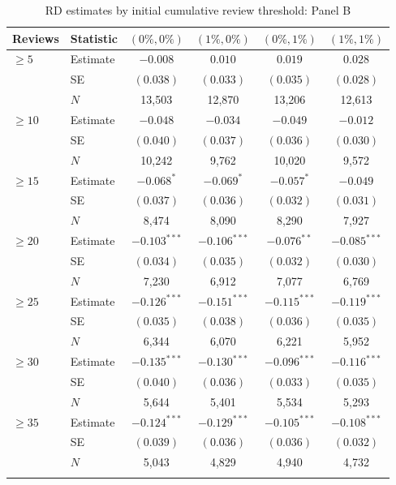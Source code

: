 \begin{table}[!htbp]
\centering
\caption{RD estimates by initial cumulative review threshold: Panel B}
\label{tab:review_threshold_5to40_panel_b}
\small
\begin{tabular}{llcccc}
\toprule
Reviews & Statistic & $(0\%,0\%)$ & $(1\%,0\%)$ & $(0\%,1\%)$ & $(1\%,1\%)$ \\
\midrule
$\geq 5$ & Estimate & $-0.008$ & $0.010$ & $0.019$ & $0.028$ \\
 & SE & $(0.038)$ & $(0.033)$ & $(0.035)$ & $(0.028)$ \\
 & $N$ & 13,503 & 12,870 & 13,206 & 12,613 \\
\addlinespace
$\geq 10$ & Estimate & $-0.048$ & $-0.034$ & $-0.049$ & $-0.012$ \\
 & SE & $(0.040)$ & $(0.037)$ & $(0.036)$ & $(0.030)$ \\
 & $N$ & 10,242 & 9,762 & 10,020 & 9,572 \\
\addlinespace
$\geq 15$ & Estimate & $-0.068^{*}$ & $-0.069^{*}$ & $-0.057^{*}$ & $-0.049$ \\
 & SE & $(0.037)$ & $(0.036)$ & $(0.032)$ & $(0.031)$ \\
 & $N$ & 8,474 & 8,090 & 8,290 & 7,927 \\
\addlinespace
$\geq 20$ & Estimate & $-0.103^{***}$ & $-0.106^{***}$ & $-0.076^{**}$ & $-0.085^{***}$ \\
 & SE & $(0.034)$ & $(0.035)$ & $(0.032)$ & $(0.030)$ \\
 & $N$ & 7,230 & 6,912 & 7,077 & 6,769 \\
\addlinespace
$\geq 25$ & Estimate & $-0.126^{***}$ & $-0.151^{***}$ & $-0.115^{***}$ & $-0.119^{***}$ \\
 & SE & $(0.035)$ & $(0.038)$ & $(0.036)$ & $(0.035)$ \\
 & $N$ & 6,344 & 6,070 & 6,221 & 5,952 \\
\addlinespace
$\geq 30$ & Estimate & $-0.135^{***}$ & $-0.130^{***}$ & $-0.096^{***}$ & $-0.116^{***}$ \\
 & SE & $(0.040)$ & $(0.036)$ & $(0.033)$ & $(0.035)$ \\
 & $N$ & 5,644 & 5,401 & 5,534 & 5,293 \\
\addlinespace
$\geq 35$ & Estimate & $-0.124^{***}$ & $-0.129^{***}$ & $-0.105^{***}$ & $-0.108^{***}$ \\
 & SE & $(0.039)$ & $(0.036)$ & $(0.036)$ & $(0.032)$ \\
 & $N$ & 5,043 & 4,829 & 4,940 & 4,732 \\
\addlinespace

\end{tabular}
\end{table}
